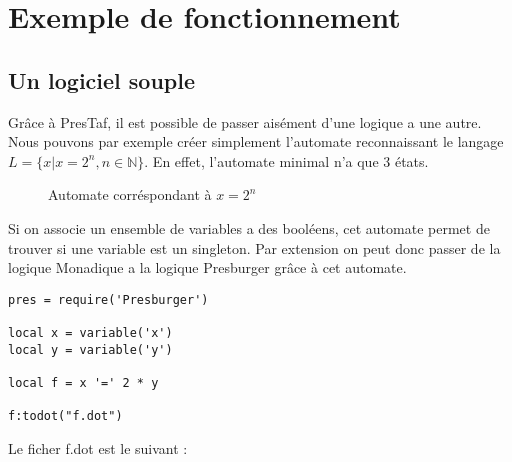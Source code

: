 \section{Exemple de fonctionnement}

\subsection{Un logiciel souple}

Grâce à PresTaf, il est possible de passer aisément d'une logique a une autre. Nous pouvons par exemple créer simplement l'automate reconnaissant le langage $L = \{x | x = 2^n, n \in \mathbb{N} \}$. En effet, l'automate minimal n'a que 3 états.

\begin{figure}[h]

\centering

\caption{Automate corréspondant à $x = 2^n$}
\end{figure}

Si on associe un ensemble de variables a des booléens, cet automate permet de trouver si une variable est un singleton. Par extension on peut donc passer de la logique Monadique a la logique Presburger grâce à cet automate.


\begin{lstlisting}[mathescape=true, frame=single]
pres = require('Presburger')

local x = variable('x')
local y = variable('y')

local f = x '=' 2 * y 

f:todot("f.dot")
\end{lstlisting}

Le ficher f.dot est le suivant :

\vspace{0.5cm}


